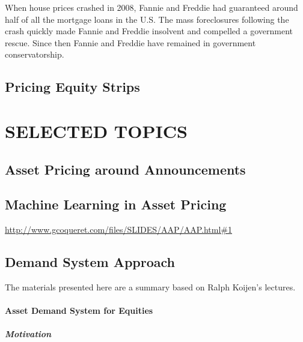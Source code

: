 \documentclass[
]{book}
\begin{document}
When house prices crashed in 2008, Fannie and Freddie had guaranteed around half of all the mortgage loans in the U.S. The mass foreclosures following the crash quickly made Fannie and Freddie insolvent and compelled a government rescue. Since then Fannie and Freddie have remained in government conservatorship.

\hypertarget{pricing-equity-strips}{%
\chapter{Pricing Equity Strips}\label{pricing-equity-strips}}

\hypertarget{part-selected-topics}{%
\part*{SELECTED TOPICS}\label{part-selected-topics}}

\hypertarget{asset-pricing-around-announcements}{%
\chapter{Asset Pricing around Announcements}\label{asset-pricing-around-announcements}}

\hypertarget{machine-learning-in-asset-pricing}{%
\chapter{Machine Learning in Asset Pricing}\label{machine-learning-in-asset-pricing}}

\url{http://www.gcoqueret.com/files/SLIDES/AAP/AAP.html\#1}

\hypertarget{demand-system-approach}{%
\chapter{Demand System Approach}\label{demand-system-approach}}

The materials presented here are a summary based on Ralph Koijen's lectures.

\hypertarget{asset-demand-system-for-equities}{%
\subsection{Asset Demand System for Equities}\label{asset-demand-system-for-equities}}

\hypertarget{motivation}{%
\subsubsection{Motivation}\label{motivation}}
\end{document}

